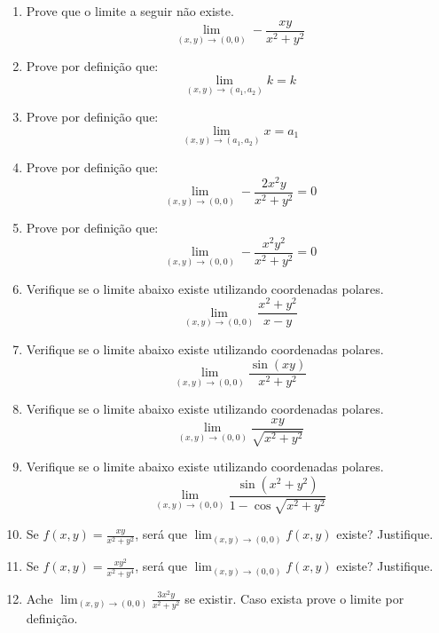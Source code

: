 \documentclass[11pt,a4paper]{article}
\newcommand{\limite}{\displaystyle\lim}
\begin{document}
\begin{enumerate}
	\item Prove que o limite a seguir não existe.
	$$\limite_{(x,y) \to (0,0)} - \displaystyle\frac{xy}{x^2 + y^2}$$
	
	\item Prove por definição que:
	$$\limite_{(x,y) \to (a_1, a_2)} k = k$$
		
	\item Prove por definição que:
	$$\limite_{(x,y) \to (a_1, a_2)} x = a_1$$
	
	\item Prove por definição que:
	$$\limite_{(x,y) \to (0,0)} - \displaystyle\frac{2x^2y}{x^2 + y^2} = 0$$
	
	\item Prove por definição que:
	$$\limite_{(x,y) \to (0,0)} - \displaystyle\frac{x^2y^2}{x^2 + y^2} = 0$$
	\item Verifique se o limite abaixo existe utilizando coordenadas polares.
	$$\limite_{(x,y) \to (0,0)} \displaystyle\frac{x^2 + y^2}{x - y}$$
	
	
	
	
	
	
	
	
	
	
	
	
	
	
	
	
	
	
	
	\item Verifique se o limite abaixo existe utilizando coordenadas polares.
	$$\limite_{(x,y) \to (0,0)} \displaystyle\frac{\sin (xy)}{x^2 + y^2}$$
	
	\item Verifique se o limite abaixo existe utilizando coordenadas polares.
	$$\limite_{(x,y) \to (0,0)} \displaystyle\frac{xy}{\sqrt{x^2 + y^2}}$$
	\item Verifique se o limite abaixo existe utilizando coordenadas polares.
	$$\limite_{(x,y) \to (0,0)} \displaystyle\frac{\sin (x^2 + y^2)}{1 - \cos \sqrt{x^2 + y^2}}$$
	
	\item Se $f(x,y) = \displaystyle\frac{xy}{x^2 + y^2}$, será que $\limite_{(x,y) \to (0,0)} f(x,y)$ existe? Justifique.
	
	\item Se $f(x,y) = \displaystyle\frac{xy^2}{x^2 + y^4}$, será que $\limite_{(x,y) \to (0,0)} f(x,y)$ existe? Justifique.
	
	\item Ache $\limite_{(x,y) \to (0,0)} \displaystyle\frac{3x^2y}{x^2 + y^2}$ se existir. Caso exista prove o limite por definição.
	

\end{enumerate}
\end{document}
